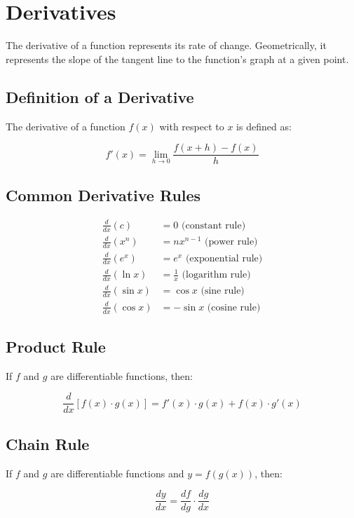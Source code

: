 \documentclass{article}
\begin{document}
\section{Derivatives}

The derivative of a function represents its rate of change. Geometrically, it represents the slope of the tangent line to the function's graph at a given point.

\subsection{Definition of a Derivative}

The derivative of a function $f(x)$ with respect to $x$ is defined as:

$$f'(x) = \lim_{h \to 0} \frac{f(x + h) - f(x)}{h}$$

\subsection{Common Derivative Rules}

\begin{align}
\frac{d}{dx}(c) &= 0 \text{ (constant rule)} \\
\frac{d}{dx}(x^n) &= nx^{n-1} \text{ (power rule)} \\
\frac{d}{dx}(e^x) &= e^x \text{ (exponential rule)} \\
\frac{d}{dx}(\ln x) &= \frac{1}{x} \text{ (logarithm rule)} \\
\frac{d}{dx}(\sin x) &= \cos x \text{ (sine rule)} \\
\frac{d}{dx}(\cos x) &= -\sin x \text{ (cosine rule)}
\end{align}

\subsection{Product Rule}

If $f$ and $g$ are differentiable functions, then:

$$\frac{d}{dx}[f(x) \cdot g(x)] = f'(x) \cdot g(x) + f(x) \cdot g'(x)$$

\subsection{Chain Rule}

If $f$ and $g$ are differentiable functions and $y = f(g(x))$, then:

$$\frac{dy}{dx} = \frac{df}{dg} \cdot \frac{dg}{dx}$$
\end{document}
